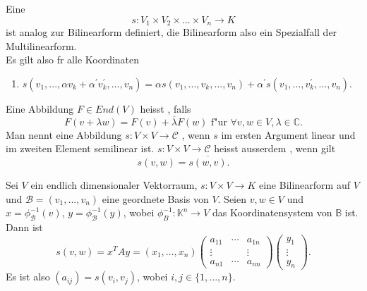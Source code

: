 \documentclass[11pt, a4paper]{article}
\begin{document}
\begin{definition}
Eine  
\begin{equation*}
s : V_1 \times V_2 \times ... \times V_n \rightarrow K
\end{equation*}
ist analog zur Bilinearform definiert, die Bilinearform also ein Spezialfall der Multilinearform.
\\Es gilt also f\uee r alle Koordinaten
\begin{enumerate}
\item[\bt{B1}] $s(v_1, ...,  \alpha v_k + \alpha^\prime v_k^\prime, ...,  v_n) = \alpha s(v_1, ..., v_k, ..., v_n) + \alpha^\prime s(v_1, ..., v_k^\prime, ..., v_n)$.
\end{enumerate}
\end{definition}

\begin{definition}
Eine Abbildung $F \in End(V)$ heisst , falls 
\begin{equation*}
F(v + \lambda w) = F(v ) + \overline{\lambda} F(w) \text{ f"ur } \forall v, w \in V, \lambda \in \mathbb{C}.
\end{equation*}
Man nennt eine Abbildung $s: V \times V \rightarrow \mathcal{C}$ , wenn $s$ im ersten Argument linear und im zweiten Element semilinear ist.
$s : V \times V \rightarrow \mathcal{C}$ heisst ausserdem , wenn gilt
\begin{equation*}
s(v, w) = \overline{s(w, v)}.
\end{equation*}
\end{definition}

\begin{remark} Sei $V$ ein endlich dimensionaler Vektorraum, $s : V \times V \rightarrow K$ eine Bilinearform auf $V$ und $\mathcal{B} = (v_1, ..., v_n)$ eine geordnete Basis von $V$. Seien $v, w \in V$ und $x = \phi^{-1}_\mathcal{B}(v)$, $y = \phi^{-1}_\mathcal{B}(y)$, wobei $\phi^{-1}_B : \mathbb{K}^n \rightarrow V$ das Koordinatensystem von $\mathbb{B}$ ist. Dann ist
\begin{equation*}
s(v, w)= x^T A y=\left(x_{1}, \ldots, x_{n}\right)\left(\begin{array}{ccc}a_{11} & \cdots & a_{1 n} \\ \vdots & & \vdots \\ a_{n 1} & \cdots & a_{n n}\end{array}\right)\left(\begin{array}{c}y_{1} \\ \vdots \\ y_{n}\end{array}\right).
\end{equation*}
Es ist also $(a_{ij}) = s(v_i, v_j)$, wobei $i, j \in \{1, ..., n\}$.
\end{remark}
\end{document}
